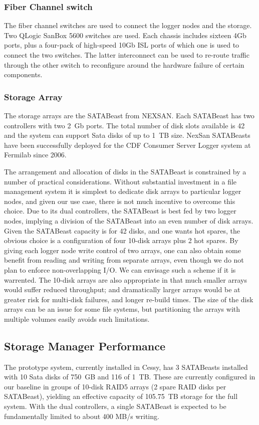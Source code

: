 \subsubsection{Fiber Channel switch}
The fiber channel switches are used to connect the logger nodes and the storage. 
Two QLogic SanBox 5600 switches are used. 
Each chassis includes sixteen 4Gb ports, plus a four-pack of high-speed 10Gb ISL ports 
of which one is used to connect the two switches.
The latter interconnect can be used to re-route traffic through the other switch
to reconfigure around the hardware failure of certain components.

\subsubsection{Storage Array}
The storage arrays are the SATABeast from NEXSAN. 
Each SATABeast has two controllers with two 2~Gb ports.
The total number of disk slots available is 42 and the system can support Sata disks 
of up to 1~TB size. 
NexSan SATABeasts have been successfully deployed for the CDF Consumer Server Logger system 
at Fermilab since 2006.

The arrangement and allocation of disks in the SATABeast is constrained by a number
of practical considerations.
Without substantial investment in a file management system it is simplest
to dedicate disk arrays to particular logger nodes, and given our use case, 
there is not much incentive to overcome this choice.
Due to its dual controllers, the SATABeast is best fed by two logger nodes,
implying a division of the SATABeast into an even number of disk arrays.
Given the  SATABeast capacity is for 42 disks, and one wants hot spares, 
the obvious choice is a configuration of four 10-disk arrays plus 2 hot spares.
By giving each logger node write control of two arrays, one can also obtain some benefit
from reading and writing from separate arrays, even though we do not plan
to enforce non-overlapping I/O. We can envisage such a scheme if it is warrented.
The 10-disk arrays are also appropriate in that much smaller arrays would
suffer reduced throughput; and dramatically larger arrays would be at greater
risk for multi-disk failures, and longer re-build times.
The size of the disk arrays can be an issue for some file systems, 
but partitioning the arrays with multiple volumes easily avoids such limitations.


\subsection{Storage Manager Performance}
The prototype system, currently installed in Cessy, has
3 SATABeasts installed  with 10 Sata disks of 750~GB  and 116 of 1~TB.
These are currently configured in our baseline in groups of 10-disk RAID5 arrays 
(2 spare RAID disks per SATABeast), yielding an effective capacity of 105.75~TB storage
for the full system.
With the dual controllers, a single SATABeast is expected to be fundamentally 
limited to about 400 MB/s writing.

